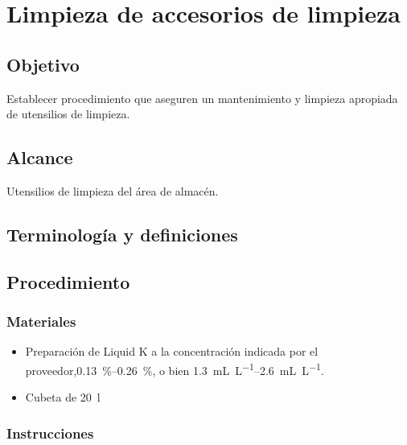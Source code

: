 \thispagestyle{formato-PI}
\renewcommand{\MenorVer}{0}
\renewcommand{\MayorVer}{2}
\renewcommand{\Codigo}{HYS-12-IT}
\renewcommand{\FechaPub}{2023--01}
\renewcommand{\Titulo}{Limpieza de accesorios de limpieza}

\section{\Titulo}

\subsection{Objetivo}
Establecer procedimiento que aseguren un mantenimiento y limpieza apropiada de utensilios de limpieza.

\subsection{Alcance}
Utensilios de limpieza del área de almacén.

\subsection{Terminología y definiciones}

\begin{description}
\end{description}

\subsection{Procedimiento}
\subsubsection{Materiales}
\begin{itemize}
	\item Preparación de Liquid K a la concentración indicada por el proveedor,\qtyrange{0.13}{0.26}{\percent}, o bien \qtyrange{1.3}{2.6}{\milli\liter\per\liter}.
	\item Cubeta de \qty{20}{\litre}
\end{itemize}

\subsubsection{Instrucciones}


